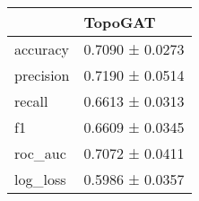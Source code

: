 \begin{tabular}{ll}
\toprule
 & TopoGAT \\
\midrule
accuracy & 0.7090 ± 0.0273 \\
precision & 0.7190 ± 0.0514 \\
recall & 0.6613 ± 0.0313 \\
f1 & 0.6609 ± 0.0345 \\
roc_auc & 0.7072 ± 0.0411 \\
log_loss & 0.5986 ± 0.0357 \\
\bottomrule
\end{tabular}
